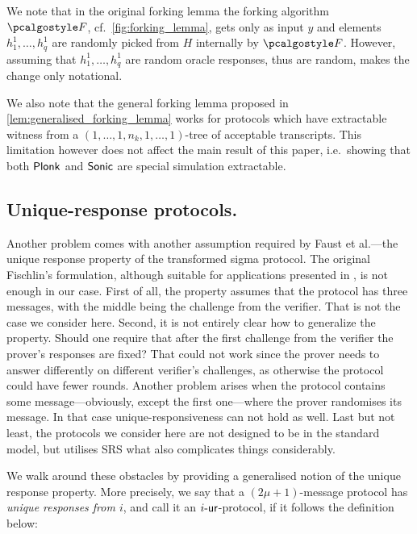 \documentclass[runningheads,11pt]{llncs}
\begin{document}
We note that in the original forking lemma the forking algorithm $\forking$,
cf.~\cref{fig:forking_lemma}, gets only as input $y$ and elements $h^1_1, \ldots,
h^1_q$ are randomly picked from $H$ internally by $\forking$. However, assuming
that $h^1_1, \ldots, h^1_q$ are random oracle responses, thus are random, makes
the change only notational.

We also note that the general forking lemma proposed in
\cref{lem:generalised_forking_lemma} works for protocols which have extractable
witness from a $(1, \ldots, 1, n_k, 1, \ldots, 1)$-tree of acceptable
transcripts. This limitation however does not affect the main result of this
paper, i.e.~showing that both $\textnormal{\textsf{Plonk}}$ and ${\textnormal{\textsf{Sonic}}}$ are special simulation extractable.

\subsection{Unique-response protocols.}
Another problem comes with another assumption required by Faust et al.---the
unique response property of the transformed sigma protocol. The original
Fischlin's formulation, although suitable for applications presented in
\cite{C:Fischlin05,INDOCRYPT:FKMV12}, is not enough in our case. First of all,
the property assumes that the protocol has three messages, with the middle being
the challenge from the verifier. That is not the case we consider here. Second,
it is not entirely clear how to generalize the property. Should one require that
after the first challenge from the verifier the prover's responses are fixed?
That could not work since the prover needs to answer differently on different
verifier's challenges, as otherwise the protocol could have fewer
rounds. Another problem arises when the protocol contains some
message---obviously, except the first one---where the prover randomises its
message. In that case unique-responsiveness can not hold as well. Last but not
least, the protocols we consider here are not designed to be in the standard
model, but utilises SRS what also complicates things considerably.

We walk around these obstacles by providing a generalised notion of the unique
response property. More precisely, we say that a $(2\mu + 1)$-message protocol
has \emph{unique responses from $i$}, and call it an ${i\text{-}\mathsf{ur}}$-protocol, if it
follows the definition below:
\end{document}
